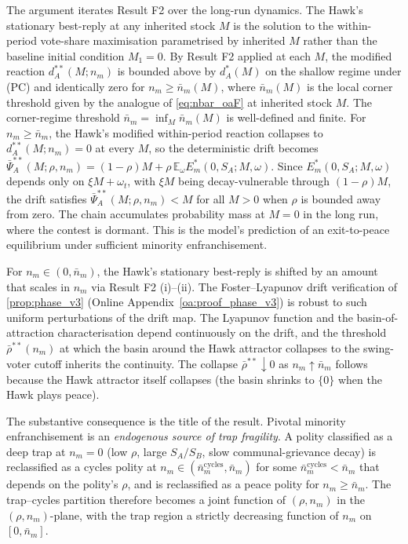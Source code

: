 \documentclass[11pt,twoside]{extarticle}
\begin{document}
The argument iterates Result F2 over the long-run dynamics. The Hawk's stationary best-reply at any inherited stock $M$ is the solution to the within-period vote-share maximisation parametrised by inherited $M$ rather than the baseline initial condition $M_1=0$. By Result F2 applied at each $M$, the modified reaction $d_A^{**}(M;n_m)$ is bounded above by $d_A^{*}(M)$ on the shallow regime under (PC) and identically zero for $n_m\ge\bar n_m(M)$, where $\bar n_m(M)$ is the local corner threshold given by the analogue of \eqref{eq:nbar_oaF} at inherited stock $M$. The corner-regime threshold $\bar n_m=\inf_M\bar n_m(M)$ is well-defined and finite. For $n_m\ge\bar n_m$, the Hawk's modified within-period reaction collapses to $d_A^{**}(M;n_m)=0$ at every $M$, so the deterministic drift becomes $\bar\Psi_A^{**}(M;\rho,n_m)=(1-\rho)M+\rho\,\mathbb{E}_\omega E_m^{*}(0,S_A;M,\omega)$. Since $E_m^{*}(0,S_A;M,\omega)$ depends only on $\xi M+\omega_t$, with $\xi M$ being decay-vulnerable through $(1-\rho)M$, the drift satisfies $\bar\Psi_A^{**}(M;\rho,n_m)<M$ for all $M>0$ when $\rho$ is bounded away from zero. The chain accumulates probability mass at $M=0$ in the long run, where the contest is dormant. This is the model's prediction of an exit-to-peace equilibrium under sufficient minority enfranchisement.

For $n_m\in(0,\bar n_m)$, the Hawk's stationary best-reply is shifted by an amount that scales in $n_m$ via Result F2 (i)--(ii). The Foster--Lyapunov drift verification of \autoref{prop:phase_v3} (Online Appendix~\ref{oa:proof_phase_v3}) is robust to such uniform perturbations of the drift map. The Lyapunov function and the basin-of-attraction characterisation depend continuously on the drift, and the threshold $\bar\rho^{**}(n_m)$ at which the basin around the Hawk attractor collapses to the swing-voter cutoff inherits the continuity. The collapse $\bar\rho^{**}\downarrow 0$ as $n_m\uparrow\bar n_m$ follows because the Hawk attractor itself collapses (the basin shrinks to $\{0\}$ when the Hawk plays peace).

The substantive consequence is the title of the result. Pivotal minority enfranchisement is an \emph{endogenous source of trap fragility}. A polity classified as a deep trap at $n_m=0$ (low $\rho$, large $S_A/S_B$, slow communal-grievance decay) is reclassified as a cycles polity at $n_m\in(\bar n_m^{\text{cycles}},\bar n_m)$ for some $\bar n_m^{\text{cycles}}<\bar n_m$ that depends on the polity's $\rho$, and is reclassified as a peace polity for $n_m\ge\bar n_m$. The trap--cycles partition therefore becomes a joint function of $(\rho,n_m)$ in the $(\rho,n_m)$-plane, with the trap region a strictly decreasing function of $n_m$ on $[0,\bar n_m]$.
\end{document}
